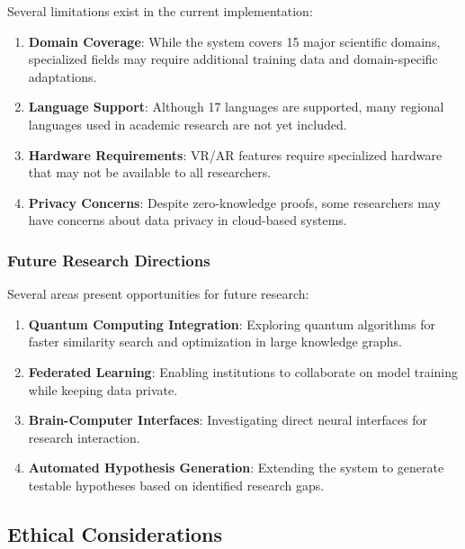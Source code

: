 \documentclass[10pt,twocolumn]{article}
\begin{document}
Several limitations exist in the current implementation:

\begin{enumerate}
    \item \textbf{Domain Coverage}: While the system covers 15 major scientific domains, specialized fields may require additional training data and domain-specific adaptations.
    
    \item \textbf{Language Support}: Although 17 languages are supported, many regional languages used in academic research are not yet included.
    
    \item \textbf{Hardware Requirements}: VR/AR features require specialized hardware that may not be available to all researchers.
    
    \item \textbf{Privacy Concerns}: Despite zero-knowledge proofs, some researchers may have concerns about data privacy in cloud-based systems.
\end{enumerate}

\subsubsection{Future Research Directions}

Several areas present opportunities for future research:

\begin{enumerate}
    \item \textbf{Quantum Computing Integration}: Exploring quantum algorithms for faster similarity search and optimization in large knowledge graphs.
    
    \item \textbf{Federated Learning}: Enabling institutions to collaborate on model training while keeping data private.
    
    \item \textbf{Brain-Computer Interfaces}: Investigating direct neural interfaces for research interaction.
    
    \item \textbf{Automated Hypothesis Generation}: Extending the system to generate testable hypotheses based on identified research gaps.
\end{enumerate}

\subsection{Ethical Considerations}
\end{document}
